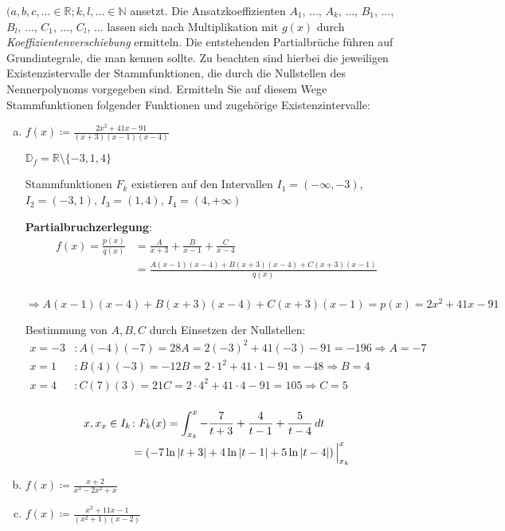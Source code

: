 \documentclass{article}
\begin{document}
$(a, b, c, \ldots \in \mathbb{R}; k, l, \ldots \in \mathbb{N}$ ansetzt.
Die Ansatzkoeffizienten $A_1$, $\ldots$, $A_k$, $\ldots$,
$B_1$, $\ldots$, $B_l$, $\ldots$, $C_1$, $\ldots$, $C_l$, $\ldots$
lassen sich nach Multiplikation mit $g(x)$ durch \textit{Koeffizientenverschiebung} ermitteln.
Die entstehenden Partialbrüche führen auf Grundintegrale, die man kennen sollte.
Zu beachten sind hierbei die jeweiligen Existenzistervalle der Stammfunktionen, die
durch die Nullstellen des Nennerpolynoms vorgegeben sind.
Ermitteln Sie auf diesem Wege Stammfunktionen folgender Funktionen und zugehörige Existenzintervalle:

\begin{enumerate}[a)]
\item $f(x) \coloneqq \frac{2x^2 + 41x - 91}{(x + 3)(x - 1)(x - 4)}$

  $\mathbb{D}_f = \mathbb{R} \setminus \{ -3, 1, 4 \}$

  Stammfunktionen $F_k$ existieren auf den Intervallen $I_1 = (-\infty, -3)$, $I_2 = ( -3, 1 )$, $I_3 = ( 1, 4 )$,
  $I_4 = ( 4, +\infty )$

  \textbf{Partialbruchzerlegung}:
  \begin{align*}
    f(x) = \frac{p(x)}{q(x)} &= \frac{A}{x + 3} + \frac{B}{x - 1} + \frac{C}{x - 4} \\
                             &= \frac{A(x - 1)(x - 4) + B(x + 3)(x - 4) + C(x + 3)(x - 1)}{q(x)} \\
  \end{align*}

  $\Rightarrow A(x - 1)(x - 4) + B(x + 3)(x - 4) + C(x + 3)(x - 1) = p(x) = 2x^2 + 41x - 91$

  Bestimmung von $A, B, C$ durch Einsetzen der Nullstellen:
  \begin{align*}
    x = -3 &\colon A(-4)(-7) = 28A = 2 (-3)^2 + 41 (-3) - 91 = -196 \Rightarrow A = -7 \\
    x = 1 &\colon B(4)(-3) = -12B = 2 \cdot 1^2 + 41 \cdot 1 - 91 = -48 \Rightarrow B = 4 \\
    x = 4 &\colon C(7)(3) = 21C = 2 \cdot 4^2 + 41 \cdot 4 - 91 = 105 \Rightarrow C = 5 \\
  \end{align*}

  \begin{align*}
    x, x_x \in I_k &\colon F_k(x) = \int_{x_k}^x - \frac{7}{t + 3} + \frac{4}{t - 1} + \frac{5}{t - 4} \, dt \\
                   &= \left( -7 \ln\abs{t + 3} + 4 \ln\abs{t - 1} + 5 \ln\abs{t - 4} \right) {\Big |}_{x_k}^x
  \end{align*}
\item $f(x) \coloneqq \frac{x + 2}{x^3 - 2x^2 + x}$
\item $f(x) \coloneqq \frac{x^2 + 11x - 1}{(x^2 + 1)(x - 2)}$
\end{enumerate}
\end{document}

